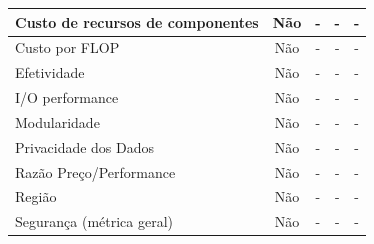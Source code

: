 \documentclass[conference]{IEEEtran}
\begin{document}
\begin{table}[]
\begin{tabular}{|l|c|c|c|c|}
Custo de recursos de componentes                               & \cellcolor[HTML]{EA9999}Não & \cellcolor[HTML]{EA9999}-                          & \cellcolor[HTML]{EA9999}-                          & \cellcolor[HTML]{EA9999}-                        \\ \hline
Custo por FLOP                                                 & \cellcolor[HTML]{EA9999}Não & \cellcolor[HTML]{EA9999}-                          & \cellcolor[HTML]{EA9999}-                          & \cellcolor[HTML]{EA9999}-                        \\ \hline
Efetividade                                                    & \cellcolor[HTML]{EA9999}Não & \cellcolor[HTML]{EA9999}-                          & \cellcolor[HTML]{EA9999}-                          & \cellcolor[HTML]{EA9999}-                        \\ \hline
I/O performance                                                & \cellcolor[HTML]{EA9999}Não & \cellcolor[HTML]{EA9999}-                          & \cellcolor[HTML]{EA9999}-                          & \cellcolor[HTML]{EA9999}-                        \\ \hline
Modularidade                                                   & \cellcolor[HTML]{EA9999}Não & \cellcolor[HTML]{EA9999}-                          & \cellcolor[HTML]{EA9999}-                          & \cellcolor[HTML]{EA9999}-                        \\ \hline
Privacidade dos Dados                                          & \cellcolor[HTML]{EA9999}Não & \cellcolor[HTML]{EA9999}-                          & \cellcolor[HTML]{EA9999}-                          & \cellcolor[HTML]{EA9999}-                        \\ \hline
Razão Preço/Performance                                        & \cellcolor[HTML]{EA9999}Não & \cellcolor[HTML]{EA9999}-                          & \cellcolor[HTML]{EA9999}-                          & \cellcolor[HTML]{EA9999}-                        \\ \hline
Região                                                         & \cellcolor[HTML]{EA9999}Não & \cellcolor[HTML]{EA9999}-                          & \cellcolor[HTML]{EA9999}-                          & \cellcolor[HTML]{EA9999}-                        \\ \hline
Segurança (métrica geral)                                      & \cellcolor[HTML]{EA9999}Não & \cellcolor[HTML]{EA9999}-                          & \cellcolor[HTML]{EA9999}-                          & \cellcolor[HTML]{EA9999}-                        \\ \hline

\end{tabular}
\end{table}
\end{document}
